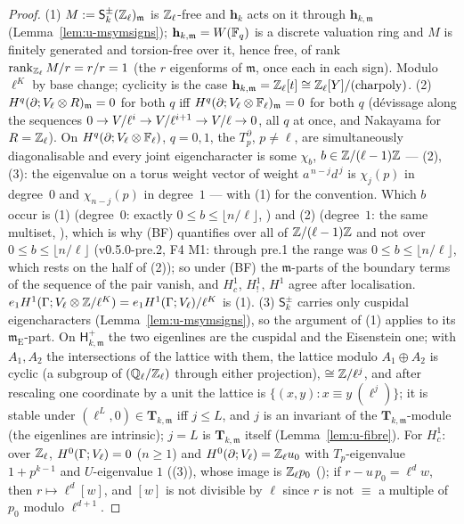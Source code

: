 \documentclass[11pt]{article}
\newcommand{\hcusp}{\mathbf{h}}                   %
\newcommand{\Tu}{\mathbf{T}}                      %
\newcommand{\Eis}{\mathrm{E}}
\newcommand{\Zl}{\Z_\ell}
\newcommand{\Ql}{\Q_\ell}
\begin{document}
\begin{proof}
(1) $M:=\mathsf S^{\pm}_k(\Zl)_{\mathfrak m}$ is $\Zl$-free and $\hcusp_k$ acts on it through $\hcusp_{k,\mathfrak m}$ (Lemma~\ref{lem:u-msymsigns}); $\hcusp_{k,\mathfrak m}=W(\F_q)$ is a discrete
valuation ring and $M$ is finitely generated and torsion-free over it, hence free, of rank $\rank_{\Zl}M/r=r/r=1$ (the $r$ eigenforms of $\mathfrak m$, once each in each sign). Modulo
$\ell^{K}$ by base change; cyclicity is the case $\hcusp_{k,\mathfrak m}=\Zl[t]\cong\Zl[Y]/(\mathrm{charpoly})$. (2) $H^{q}(\partial;V_\ell\otimes R)_{\mathfrak m}=0$ for both $q$ iff
$H^{q}(\partial;V_\ell\otimes\mathbb{F}_\ell)_{\mathfrak m}=0$ for both $q$ (dévissage along the sequences $0\to V/\ell^{i}\to V/\ell^{i+1}\to V/\ell\to0$, all $q$ at once, and Nakayama for
$\cring=\Zl$). On $H^{q}(\partial;V_\ell\otimes\mathbb{F}_\ell)$, $q=0,1$, the $T^{\partial}_p$, $p\ne\ell$, are simultaneously diagonalisable and every joint eigencharacter is some $\chi_b$,
$b\in\mathbb{Z}/(\ell-1)\mathbb{Z}$ --- (2),(3): the eigenvalue on a torus weight vector of weight $a^{\,n-j}d^{\,j}$ is $\chi_j(p)$ in degree~$0$ and $\chi_{n-j}(p)$ in degree~$1$ ---
with (1) for the convention. Which $b$ occur is (1) (degree~$0$: exactly $0\le b\le\lfloor n/\ell\rfloor$, \PROVED) and (2) (degree~$1$: the same
multiset, \CONJ), which is why (BF) quantifies over all of $\mathbb{Z}/(\ell-1)\mathbb{Z}$ and not over $0\le b\le\lfloor n/\ell\rfloor$ (v0.5.0-pre.2, F4 M1: through pre.1 the range was
$0\le b\le\lfloor n/\ell\rfloor$, which rests on the \CONJ{} half of (2)); so under (BF) the $\mathfrak m$-parts of the boundary terms of the sequence of the pair vanish, and $H^{1}_c$, $H^{1}_{!}$,
$H^{1}$ agree after localisation. $e_1H^{1}(\Gamma;V_\ell\otimes\mathbb{Z}/\ell^{K})=e_1H^{1}(\Gamma;V_\ell)/\ell^{K}$ is (1). (3) $\mathsf S^{\pm}_k$ carries only cuspidal
eigencharacters (Lemma~\ref{lem:u-msymsigns}), so the argument of (1) applies to its $\mathfrak m_\Eis$-part. On $\mathsf H^{+}_{k,\mathfrak m}$ the two eigenlines are the cuspidal and the
Eisenstein one; with $A_1,A_2$ the intersections of the lattice with them, the lattice modulo $A_1\oplus A_2$ is cyclic (a subgroup of $(\Ql/\Zl)$ through either projection),
$\cong\mathbb{Z}/\ell^{j}$, and after rescaling one coordinate by a unit the lattice is $\{(x,y):x\equiv y\ (\ell^{j})\}$; it is stable under $(\ell^{L},0)\in\Tu_{k,\mathfrak m}$ iff $j\le L$, and
$j$ is an invariant of the $\Tu_{k,\mathfrak m}$-module (the eigenlines are intrinsic); $j=L$ is $\Tu_{k,\mathfrak m}$ itself (Lemma~\ref{lem:u-fibre}). For $H^{1}_c$: over $\Zl$,
$H^{0}(\Gamma;V_\ell)=0$ ($n\ge1$) and $H^{0}(\partial;\Vcoef_\ell)=\Zl u_0$ with $T_p$-eigenvalue $1+p^{k-1}$ and $U$-eigenvalue $1$ ((3)), whose image is
$\Zl p_0$ (); if $r-u\,p_0=\ell^{d}w$, then $r\mapsto\ell^{d}[w]$, and $[w]$ is not divisible by $\ell$ since $r$ is not $\equiv$ a multiple of $p_0$ modulo $\ell^{d+1}$.
\end{proof}
\end{document}
